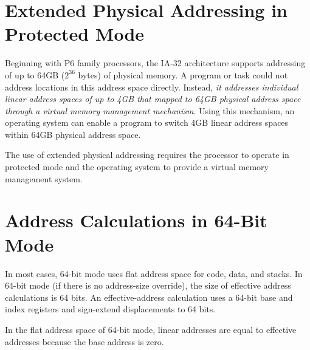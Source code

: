 \section{Extended Physical Addressing in Protected Mode}
Beginning with P6 family processors, the IA-32 architecture supports
addressing of up to 64GB ($2^{36}$ bytes) of physical memory. A program or
task could not address locations in this address space directly. Instead, {\em
  it addresses individual linear address spaces of up to 4GB that mapped to 64GB
physical address space through a virtual memory management mechanism\/}. Using
this mechanism, an operating system can enable a program to switch 4GB linear
address spaces within 64GB physical address space. 

The use of extended physical addressing requires the processor to operate in
protected mode and the operating system to provide a virtual memory management
system.   

\section{Address Calculations in 64-Bit Mode}
In most cases, 64-bit mode uses flat address space for code, data, and
stacks. In 64-bit mode (if there is no address-size override), the size of
effective address calculations is 64 bits. An effective-address calculation
uses a 64-bit base and index registers and sign-extend displacements to 64
bits. 

In the flat address space of 64-bit mode, linear addresses are equal to
effective addresses because the base address is zero. 


